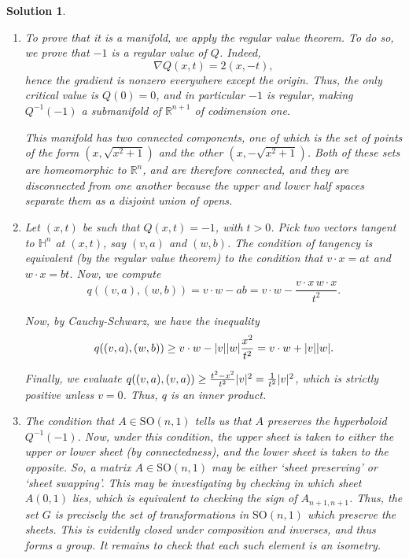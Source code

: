 \documentclass{article}
\theoremstyle{plain}
\theoremstyle{nonumberplain}
\newtheorem{sol}{Solution}
\newcommand{\R}{\mathbb{R}}
\newcommand{\HH}{\mathbb{H}}
\newcommand{\SO}{\mathrm{SO}}
\newcommand{\grad}{\nabla}
\DeclarePairedDelimiter{\norm}{\lvert}{\rvert}
\begin{document}
\begin{sol}
\leavevmode
\begin{enumerate}
\item To prove that it is a manifold, we apply the regular value theorem. To do so, we prove that $-1$ is a regular value of $Q$. Indeed,
\begin{equation}
\grad Q(x,t) = 2 (x, -t),
\end{equation}
hence the gradient is nonzero everywhere except the origin. Thus, the only critical value is $Q(0) = 0$, and in particular $-1$ is regular, making $Q^{-1}(-1)$ a submanifold of $\R^{n+1}$ of codimension one.

This manifold has two connected components, one of which is the set of points of the form $(x,\sqrt{x^2 + 1})$ and the other $(x,-\sqrt{x^2 + 1})$. Both of these sets are homeomorphic to $\R^n$, and are therefore connected, and they are disconnected from one another because the upper and lower half spaces separate them as a disjoint union of opens.


\item Let $(x,t)$ be such that $Q(x,t) = -1$, with $t > 0$. Pick two vectors tangent to $\HH^n$ at $(x,t)$, say $(v,a)$ and $(w,b)$. The condition of tangency is equivalent (by the regular value theorem) to the condition that $v \cdot x = at$ and $w \cdot x = bt$. Now, we compute
\begin{equation}\label{eq:q}
q((v,a),(w,b)) = v \cdot w - ab = v \cdot w - \frac{v \cdot x \, w \cdot x}{t^2}.
\end{equation}

Now, by Cauchy-Schwarz, we have the inequality
\begin{equation}
q((v,a),(w,b)) \geq v \cdot w - \norm{v} \norm{w} \frac{x^2}{t^2} = v \cdot w + \norm{v} \norm{w}.
\end{equation}

Finally, we evaluate $q((v,a),(v,a)) \geq \frac{t^2 - x^2}{t^2} \norm{v}^2 = \frac1{t^2} \norm{v}^2$, which is strictly positive unless $v = 0$. Thus, $q$ is an inner product.

\item The condition that $A \in \SO(n,1)$ tells us that $A$ preserves the hyperboloid $Q^{-1}(-1)$. Now, under this condition, the upper sheet is taken to either the upper or lower sheet (by connectedness), and the lower sheet is taken to the opposite. So, a matrix $A \in \SO(n,1)$ may be either `sheet preserving' or `sheet swapping'. This may be investigating by checking in which sheet $A(0,1)$ lies, which is equivalent to checking the sign of $A_{n+1,n+1}$. Thus, the set $G$ is precisely the set of transformations in $\SO(n,1)$ which preserve the sheets. This is evidently closed under composition and inverses, and thus forms a group. It remains to check that each such element is an isometry.


\end{enumerate}
\end{sol}
\end{document}
